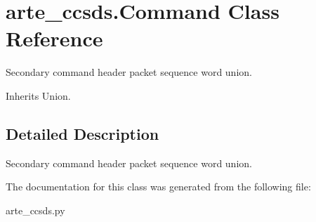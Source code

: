 \section{arte\+\_\+ccsds.\+Command Class Reference}
\label{classarte__ccsds_1_1_command}


Secondary command header packet sequence word union.  




Inherits Union.



\subsection{Detailed Description}
Secondary command header packet sequence word union. 



The documentation for this class was generated from the following file\+:\begin{DoxyCompactItemize}
\item 
arte\+\_\+ccsds.\+py\end{DoxyCompactItemize}
